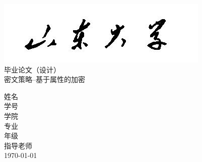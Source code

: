 \vspace{30mm}
\begin{center}
\includegraphics[scale=0.7]{sdu_pic.jpg}\\
 毕业论文（设计）\\
%
\vspace{15mm}
\heiti{} 密文策略--基于属性的加密\par
%
\vspace{60mm}
姓\qquad 名\uline{\kaishu{}}\\
学\qquad 号\uline{\kaishu{}}\\
学\qquad 院\uline{\kaishu{}}\\
专\qquad 业\uline{\kaishu{}}\\
年\qquad 级\uline{\kaishu{}}\\
指导老师\uline{\kaishu{}}\\
%
\vspace{5mm}
\today
\end{center}
